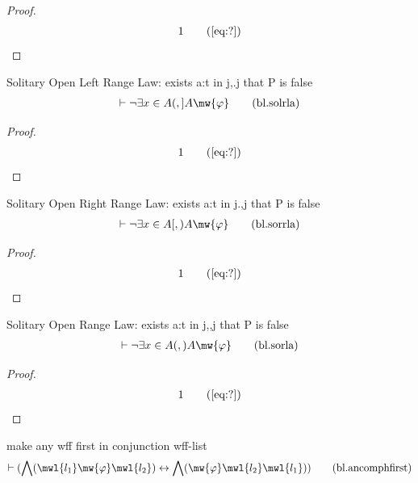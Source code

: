 \begin{proof}
\begin{align}
  1 &&  & &(\mbox{\ref{eq:?}})\notag
\end{align}
\end{proof}

\begin{lemma} Solitary Open Left Range Law: exists a:t
in j,.j that P is false
\begin{align}
\vdash \lnot \exists x \in A (,] A
    \mw{\varphi}\label{eq:bl.solrla}\tag{bl.solrla}
\end{align}
\end{lemma}

\begin{proof}
\begin{align}
  1 &&  & &(\mbox{\ref{eq:?}})\notag
\end{align}
\end{proof}

\begin{lemma} Solitary Open Right Range Law: exists a:t
in j.,j that P is false
\begin{align}
\vdash \lnot \exists x \in A [,) A
    \mw{\varphi}\label{eq:bl.sorrla}\tag{bl.sorrla}
\end{align}
\end{lemma}

\begin{proof}
\begin{align}
  1 &&  & &(\mbox{\ref{eq:?}})\notag
\end{align}
\end{proof}

\begin{lemma} Solitary Open Range Law: exists a:t in
j,,j that P is false
\begin{align}
\vdash \lnot \exists x \in A (,) A
    \mw{\varphi}\label{eq:bl.sorla}\tag{bl.sorla}
\end{align}
\end{lemma}

\begin{proof}
\begin{align}
  1 &&  & &(\mbox{\ref{eq:?}})\notag
\end{align}
\end{proof}

\begin{lemma} make any wff first in conjunction
wff-list
\begin{align}
\vdash ( \bigwedge( \mwl{l_1} \mw{\varphi} \mwl{l_2} ) \leftrightarrow
    \bigwedge( \mw{\varphi} \mwl{l_2} \mwl{l_1} )
    )\label{eq:bl.ancomphfirst}\tag{bl.ancomphfirst}
\end{align}
\end{lemma}

